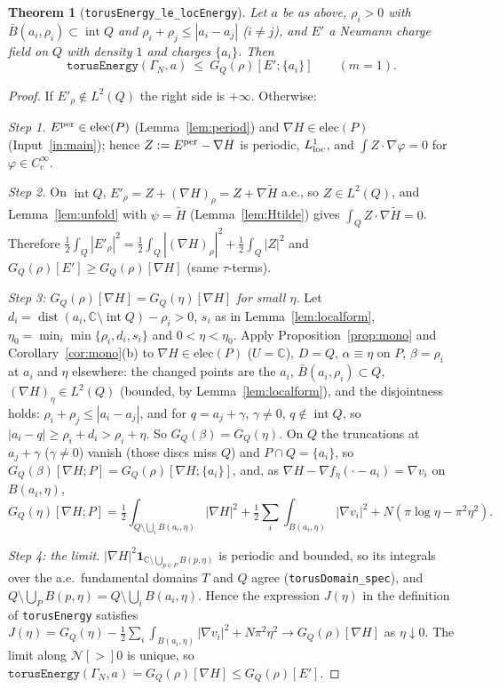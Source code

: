\documentclass[11pt]{article}
\newtheorem{theorem}{Theorem}[section]
\theoremstyle{definition}
\theoremstyle{remark}
\newcommand{\C}{\mathbb C}
\DeclareMathOperator{\dist}{dist}
\begin{document}
\begin{theorem}[\texttt{torusEnergy\_le\_locEnergy}]\label{thm:I5}
Let $a$ be as above, $\rho_i>0$ with $\bar B(a_i,\rho_i)\subset\operatorname{int}Q$ and $\rho_i+\rho_j\le|a_i-a_j|$ ($i\ne j$), and $E'$ a Neumann charge field on $Q$
with density $1$ and charges $\{a_i\}$. Then
\[
\texttt{torusEnergy}(\Gamma_N,a)\ \le\ G_Q(\rho)[E';\{a_i\}]\qquad(m=1).
\]
\end{theorem}
\begin{proof}
If $E'_\rho\notin L^2(Q)$ the right side is $+\infty$. Otherwise:

\emph{Step 1.} $E^{\rm per}\in\mathrm{elec}(P)$ (Lemma~\ref{lem:period}) and $\nabla H\in\mathrm{elec}(P)$ (Input~\ref{in:main}); hence $Z:=E^{\rm per}-\nabla H$ is periodic,
$L^1_{\rm loc}$, and $\int Z\cdot\nabla\varphi=0$ for $\varphi\in C^\infty_c$.

\emph{Step 2.} On $\operatorname{int}Q$, $E'_\rho=Z+(\nabla H)_\rho=Z+\nabla\tilde H$ a.e., so $Z\in L^2(Q)$, and Lemma~\ref{lem:unfold} with $\psi=\tilde H$
(Lemma~\ref{lem:Htilde}) gives $\int_QZ\cdot\nabla\tilde H=0$. Therefore $\frac12\int_Q|E'_\rho|^2=\frac12\int_Q|(\nabla H)_\rho|^2+\frac12\int_Q|Z|^2$ and
$G_Q(\rho)[E']\ge G_Q(\rho)[\nabla H]$ (same $\tau$-terms).

\emph{Step 3: $G_Q(\rho)[\nabla H]=G_Q(\eta)[\nabla H]$ for small $\eta$.} Let $d_i=\dist(a_i,\C\setminus\operatorname{int}Q)-\rho_i>0$, $s_i$ as in Lemma~\ref{lem:localform},
$\eta_0=\min_i\min\{\rho_i,d_i,s_i\}$ and $0<\eta<\eta_0$. Apply Proposition~\ref{prop:mono} and Corollary~\ref{cor:mono}(b) to $\nabla H\in\mathrm{elec}(P)$ ($U=\C$), $D=Q$,
$\alpha\equiv\eta$ on $P$, $\beta=\rho_i$ at $a_i$ and $\eta$ elsewhere: the changed points are the $a_i$, $\bar B(a_i,\rho_i)\subset Q$, $(\nabla H)_\eta\in L^2(Q)$ (bounded, by
Lemma~\ref{lem:localform}), and the disjointness holds: $\rho_i+\rho_j\le|a_i-a_j|$, and for $q=a_j+\gamma$, $\gamma\ne0$, $q\notin\operatorname{int}Q$, so
$|a_i-q|\ge\rho_i+d_i>\rho_i+\eta$. So $G_Q(\beta)=G_Q(\eta)$. On $Q$ the truncations at $a_j+\gamma$ ($\gamma\ne0$) vanish (those discs miss $Q$) and $P\cap Q=\{a_i\}$,
so $G_Q(\beta)[\nabla H;P]=G_Q(\rho)[\nabla H;\{a_i\}]$, and, as $\nabla H-\nabla f_\eta(\cdot-a_i)=\nabla v_i$ on $B(a_i,\eta)$,
\[
G_Q(\eta)[\nabla H;P]=\tfrac12\int_{Q\setminus\bigcup_iB(a_i,\eta)}|\nabla H|^2+\tfrac12\sum_i\int_{B(a_i,\eta)}|\nabla v_i|^2+N(\pi\log\eta-\pi^2\eta^2).
\]

\emph{Step 4: the limit.} $|\nabla H|^2\mathbf 1_{\C\setminus\bigcup_{p\in P}B(p,\eta)}$ is periodic and bounded, so its integrals over the a.e.\ fundamental domains $T$ and $Q$
agree (\texttt{torusDomain\_spec}), and $Q\setminus\bigcup_PB(p,\eta)=Q\setminus\bigcup_iB(a_i,\eta)$. Hence the expression $J(\eta)$ in the definition of \texttt{torusEnergy}
satisfies $J(\eta)=G_Q(\eta)-\frac12\sum_i\int_{B(a_i,\eta)}|\nabla v_i|^2+N\pi^2\eta^2\to G_Q(\rho)[\nabla H]$ as $\eta\downarrow0$. The limit along $\mathcal N[>]0$ is
unique, so $\texttt{torusEnergy}(\Gamma_N,a)=G_Q(\rho)[\nabla H]\le G_Q(\rho)[E']$.
\end{proof}
\end{document}
